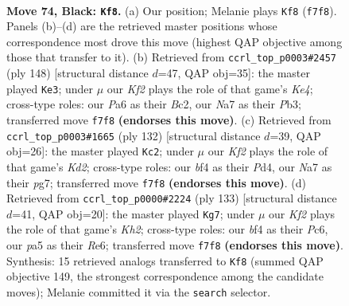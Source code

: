 \documentclass[11pt]{article}
\begin{document}
\clearpage

\begin{figure}[p]\centering
\begin{subfigure}{0.46\textwidth}\centering
\resizebox{\linewidth}{!}{%
\newchessgame
\chessboard[
  setfen={7K/n1P2k2/p1r5/P4p1p/4pBb1/N5P1/8/R7 b - - 55 74},
  showmover=false,
  pgfstyle=straightmove, color=movearrow, markmove={f7-f8}
]}
\caption{}
\end{subfigure}\hfill
\begin{subfigure}{0.46\textwidth}\centering
\resizebox{\linewidth}{!}{%
\newchessgame
\chessboard[
  setfen={1r6/4b1k1/3pP3/3P4/1pR1K3/1Pp5/2B5/8 w - - 20 75},
  showmover=false,
  pgfstyle=straightmove, color=movearrow, markmove={e4-e3}
]}
\caption{}
\end{subfigure}
\\[4pt]
\begin{subfigure}{0.46\textwidth}\centering
\resizebox{\linewidth}{!}{%
\newchessgame
\chessboard[
  setfen={1r2b3/6pk/2p1P3/R2p1pB1/p2P1P1P/P7/3K4/8 w - - 3 67},
  showmover=false,
  pgfstyle=straightmove, color=movearrow, markmove={d2-c2}
]}
\caption{}
\end{subfigure}\hfill
\begin{subfigure}{0.46\textwidth}\centering
\resizebox{\linewidth}{!}{%
\newchessgame
\chessboard[
  setfen={3R4/7k/2p1rp2/2Bb2p1/7p/2P4P/5PPK/8 b - - 43 67},
  showmover=false,
  pgfstyle=straightmove, color=movearrow, markmove={h7-g7}
]}
\caption{}
\end{subfigure}
\caption{\textbf{Move 74, Black: \texttt{Kf8}.} (a) Our position; Melanie plays \texttt{Kf8} (\texttt{f7f8}). Panels (b)--(d) are the retrieved master positions whose correspondence most drove this move (highest QAP objective among those that transfer to it). (b) Retrieved from \texttt{ccrl\_top\_p0003\#2457} (ply 148) [structural distance $d$=47, QAP obj=35]: the master played \texttt{Ke3}; under $\mu$ our \emph{Kf2} plays the role of that game's \emph{Ke4}; cross-type roles: our \emph{P}a6 as their \emph{B}c2, our \emph{N}a7 as their \emph{P}b3; transferred move \texttt{f7f8} \textbf{(endorses this move)}. (c) Retrieved from \texttt{ccrl\_top\_p0003\#1665} (ply 132) [structural distance $d$=39, QAP obj=26]: the master played \texttt{Kc2}; under $\mu$ our \emph{Kf2} plays the role of that game's \emph{Kd2}; cross-type roles: our \emph{b}f4 as their \emph{P}d4, our \emph{N}a7 as their \emph{p}g7; transferred move \texttt{f7f8} \textbf{(endorses this move)}. (d) Retrieved from \texttt{ccrl\_top\_p0000\#2224} (ply 133) [structural distance $d$=41, QAP obj=20]: the master played \texttt{Kg7}; under $\mu$ our \emph{Kf2} plays the role of that game's \emph{Kh2}; cross-type roles: our \emph{b}f4 as their \emph{P}c6, our \emph{p}a5 as their \emph{R}e6; transferred move \texttt{f7f8} \textbf{(endorses this move)}. Synthesis: 15 retrieved analogs transferred to \texttt{Kf8} (summed QAP objective 149, the strongest correspondence among the candidate moves); Melanie committed it via the \texttt{search} selector.}
\label{fig:thought-m147}
\end{figure}
\end{document}
